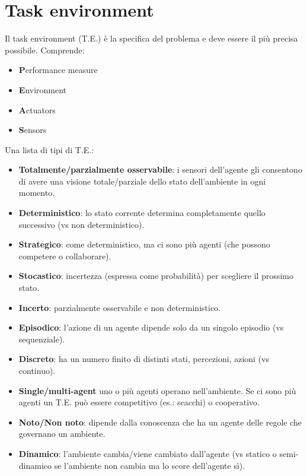 \newpage

\section{Task environment}

Il task environment (T.E.) è la specifica del problema e deve essere il
più precisa possibile. Comprende:

\begin{itemize}
 \item \textbf{P}erformance measure
 \item \textbf{E}nvironment
 \item \textbf{A}ctuators
 \item \textbf{S}ensors
\end{itemize}

Una lista di tipi di T.E.:

\begin{itemize}
 \item \textbf{Totalmente/parzialmente osservabile}: i sensori dell'agente
gli consentono di avere una visione totale/parziale dello stato dell'ambiente
in ogni momento.
 \item \textbf{Deterministico}: lo stato corrente determina completamente
quello successivo (vs non deterministico).
 \item \textbf{Strategico}: come deterministico, ma ci sono più agenti (che
possono competere o collaborare).
 \item \textbf{Stocastico}: incertezza (espressa come probabilità) per
scegliere il prossimo stato.
 \item \textbf{Incerto}: parzialmente osservabile e non deterministico.
 \item \textbf{Episodico}: l'azione di un agente dipende solo da un singolo
episodio (vs sequenziale).
 \item \textbf{Discreto}: ha un numero finito di distinti stati, percezioni,
azioni (vs continuo).
 \item \textbf{Single/multi-agent} uno o più agenti operano nell'ambiente. Se
ci sono più agenti un T.E. può essere competitivo (es.: scacchi) o cooperativo.
 \item \textbf{Noto/Non noto}: dipende dalla conoscenza che ha un agente delle
regole che governano un ambiente.
 \item \textbf{Dinamico}: l'ambiente cambia/viene cambiato dall'agente (vs
statico o semi-dinamico se l'ambiente non cambia ma lo score dell'agente sì).
\end{itemize}

